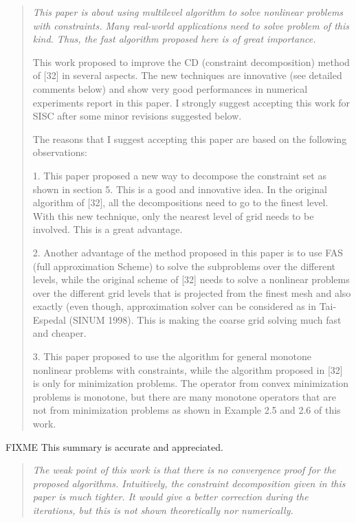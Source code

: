 \documentclass[letterpaper,final,12pt,reqno]{amsart}
\newenvironment{review}%
{\bigskip \par \begin{quote} \selectfont \sl}%
{\end{quote}}
\newcommand\short[1]{\medskip\noindent #1}   %
\begin{document}
\begin{review}
This paper is about using multilevel algorithm to solve nonlinear problems with constraints. Many real-world applications need to solve problem of this kind. Thus, the fast algorithm proposed here is of great importance.

This work proposed to improve the CD (constraint decomposition) method of [32] in several aspects. The new techniques are innovative (see detailed comments below) and show very good performances in numerical experiments report in this paper. I strongly suggest accepting this work for SISC after some minor revisions suggested below.

The reasons that I suggest accepting this paper are based on the following observations:

1. This paper proposed a new way to decompose the constraint set as shown in section 5. This is a good and innovative idea. In the original algorithm of [32], all the decompositions need to go to the finest level. With this new technique, only the nearest level of grid needs to be involved. This is a great advantage.

2. Another advantage of the method proposed in this paper is to use FAS (full approximation Scheme) to solve the subproblems over the different levels, while the original scheme of [32] needs to solve a nonlinear problems over the different grid levels that is projected from the finest mesh and also exactly (even though, approximation solver can be considered as in Tai-Espedal (SINUM 1998). This is making the coarse grid solving much fast and cheaper.

3. This paper proposed to use the algorithm for general monotone nonlinear problems with constraints, while the algorithm proposed in [32] is only for minimization problems. The operator from convex minimization problems is monotone, but there are many monotone operators that are not from minimization problems as shown in Example 2.5 and 2.6 of this work.
\end{review}

\short{FIXME This summary is accurate and appreciated.}

\begin{review}
The weak point of this work is that there is no convergence proof for the proposed algorithms. Intuitively, the constraint decomposition given in this paper is much tighter. It would give a better correction during the iterations, but this is not shown theoretically nor numerically.
\end{review}
\end{document}
